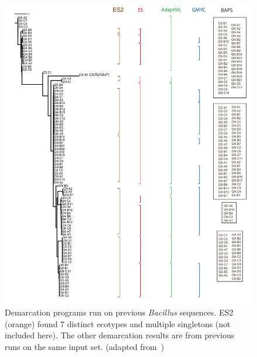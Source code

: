 \begin{figure}[h!]
  \centering
    \includegraphics[scale=0.4]{images/Bacillus-CH4}
      \caption[Demarcation programs run on previous \emph{Bacillus} sequences.]{Demarcation programs run on previous \emph{Bacillus} sequences. ES2 (orange) found 7 distinct ecotypes and multiple singletons (not included here). The other demarcation results are from previous runs on the same input set. (adapted from~\protect\cite{carlo})}
    \label{fig:Bacillus}
\end{figure}

